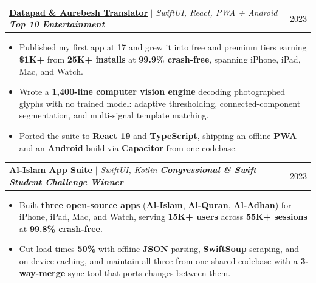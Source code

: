 \documentclass[letterpaper,11pt]{article}
\makeatletter
\newcommand{\resumeItem}[1]{
  \item\small{
    {#1\vspace{-3pt}}
  }
}
\newcommand{\resumeProjectHeading}[2]{
  \item
    \begin{tabular*}{0.97\textwidth}{l@{\extracolsep{\fill}}r}
      \small#1 & #2 \\
    \end{tabular*}\vspace{-5pt}
}
\newcommand{\resumeItemListStart}{\begin{itemize}}
\newcommand{\resumeItemListEnd}{\end{itemize}\vspace{-3pt}}
\makeatother
\begin{document}
  \resumeProjectHeading
    {\href{https://abubakrelmallah.com/star-wars/}{\textbf{Datapad \& Aurebesh Translator}} $|$ \emph{SwiftUI, React, PWA + Android \hspace{0.75em} \textit{\textbf{Top 10 Entertainment}}}}{2023}
    \resumeItemListStart
      \resumeItem{Published my first app at 17 and grew it into free and premium tiers earning \textbf{\$1K+} from \textbf{25K+ installs} at \textbf{99.9\% crash-free}, spanning iPhone, iPad, Mac, and Watch.}
      \resumeItem{Wrote a \textbf{1,400-line computer vision engine} decoding photographed glyphs with no trained model: adaptive thresholding, connected-component segmentation, and multi-signal template matching.}
      \resumeItem{Ported the suite to \textbf{React 19} and \textbf{TypeScript}, shipping an offline \textbf{PWA} and an \textbf{Android} build via \textbf{Capacitor} from one codebase.}
    \resumeItemListEnd

  \resumeProjectHeading
    {\href{https://abubakrelmallah.com/al-islam/}{\textbf{Al-Islam App Suite}} $|$ \emph{SwiftUI, Kotlin \hspace{0.75em} \textit{\textbf{Congressional \& Swift Student Challenge Winner}}}}{2023}
    \resumeItemListStart
      \resumeItem{Built \textbf{three open-source apps} (\textbf{Al-Islam}, \textbf{Al-Quran}, \textbf{Al-Adhan}) for iPhone, iPad, Mac, and Watch, serving \textbf{15K+ users} across \textbf{55K+ sessions} at \textbf{99.8\% crash-free}.}
      \resumeItem{Cut load times \textbf{50\%} with offline \textbf{JSON} parsing, \textbf{SwiftSoup} scraping, and on-device caching, and maintain all three from one shared codebase with a \textbf{3-way-merge} sync tool that ports changes between them.}
    \resumeItemListEnd
\end{document}

